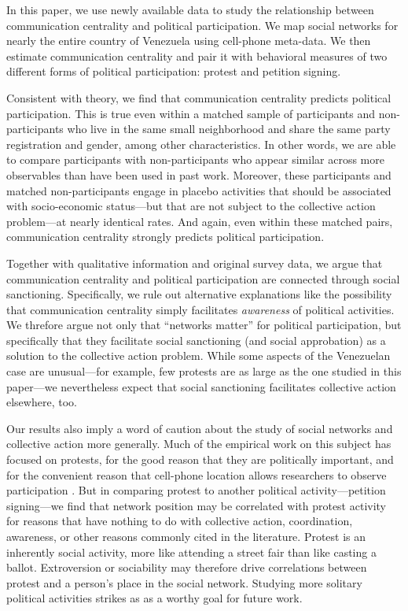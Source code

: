 \documentclass[12pt]{article}
\begin{document}
In this paper, we use newly available data to study the relationship between  communication centrality and political participation. We map social networks for nearly the entire country of Venezuela using cell-phone meta-data. We then estimate communication centrality and pair it with behavioral measures of two different forms of political participation: protest and petition signing.

Consistent with theory, we find that communication centrality predicts political participation. This is true even within a matched sample of participants and non-participants who live in the same small neighborhood and share the same party registration and gender, among other characteristics. In other words, we are able to compare participants with non-participants who appear similar across more observables than have been used in past work. Moreover, these participants and matched non-participants engage in placebo activities that should be associated with socio-economic status---but that are not subject to the collective action problem---at nearly identical rates. And again, even within these matched pairs, communication centrality strongly predicts political participation.

Together with qualitative information and original survey data, we argue that communication centrality and political participation are connected through social sanctioning. Specifically, we rule out alternative explanations like the possibility that communication centrality simply facilitates \emph{awareness} of political activities. We threfore argue not only that ``networks matter'' for political participation, but specifically that they facilitate social sanctioning (and social approbation) as a solution to the collective action problem. While some aspects of the Venezuelan case are unusual---for example, few protests are as large as the one studied in this paper---we nevertheless expect that social sanctioning facilitates collective action elsewhere, too.

Our results also imply a word of caution about the study of social networks and collective action more generally. Much of the empirical work on this subject has focused on protests, for the good reason that they are politically important, and for the convenient reason that cell-phone location allows researchers to observe participation \citep{SteinertThrelkeld:2017dy,Larson:2016vk,EnikopolovVK}. But in comparing protest to another political activity---petition signing---we find that network position may be correlated with protest activity for reasons that have nothing to do with collective action, coordination, awareness, or other reasons commonly cited in the literature. Protest is an inherently social activity, more like attending a street fair than like casting a ballot. Extroversion or sociability may therefore drive correlations between protest and a person's place in the social network. Studying more solitary political activities strikes as as a worthy goal for future work.
\end{document}
